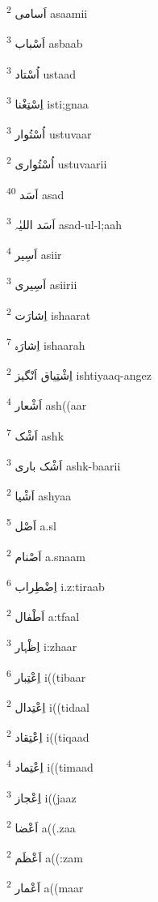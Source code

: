 \documentclass[12pt]{article}
\begin{document}
\begin{RTL}
\begin{multicols}{5}
{\ur اَسامی}   \textsuperscript{2} asaamii

{\ur اَسْباب}   \textsuperscript{3} asbaab

{\ur اُسْتاد}   \textsuperscript{3} ustaad

{\ur اِسْتِغْنا}   \textsuperscript{3} isti;gnaa

{\ur اُسْتُوار}   \textsuperscript{3} ustuvaar

{\ur اُسْتُواری}   \textsuperscript{2} ustuvaarii

{\ur اَسَد}   \textsuperscript{40} asad

{\ur اَسَد اللیٰہ}   \textsuperscript{3} asad-ul-l;aah

{\ur اَسِیر}   \textsuperscript{4} asiir

{\ur اَسِیری}   \textsuperscript{3} asiirii

{\ur اِشارَت}   \textsuperscript{2} ishaarat

{\ur اِشارَہ}   \textsuperscript{7} ishaarah

{\ur اِشْتِیاق اَنْگیز}   \textsuperscript{2} ishtiyaaq-angez

{\ur اَشْعار}   \textsuperscript{4} ash((aar

{\ur اَشْک}   \textsuperscript{7} ashk

{\ur اَشْک باری}   \textsuperscript{3} ashk-baarii

{\ur اَشْیا}   \textsuperscript{2} ashyaa

{\ur اَصْل}   \textsuperscript{5} a.sl

{\ur اَصْنام}   \textsuperscript{2} a.snaam

{\ur اِضْطِراب}   \textsuperscript{6} i.z:tiraab

{\ur اَطْفال}   \textsuperscript{2} a:tfaal

{\ur اِظْہار}   \textsuperscript{3} i:zhaar

{\ur اِعْتِبار}   \textsuperscript{6} i((tibaar

{\ur اِعْتِدال}   \textsuperscript{2} i((tidaal

{\ur اِعْتِقاد}   \textsuperscript{2} i((tiqaad

{\ur اِعْتِماد}   \textsuperscript{4} i((timaad

{\ur اِعْجاز}   \textsuperscript{3} i((jaaz

{\ur اَعْضا}   \textsuperscript{2} a((.zaa

{\ur اَعْظَم}   \textsuperscript{2} a((:zam

{\ur اَعْمار}   \textsuperscript{2} a((maar


\end{multicols}
\end{RTL}
\end{document}
